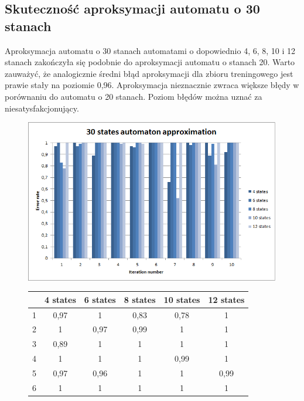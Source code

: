 \documentclass[runningheads,a4paper]{llncs}
\begin{document}
\FloatBarrier
\subsection{Skuteczność aproksymacji automatu o 30 stanach}

Aproksymacja automatu o 30 stanach automatami o dopowiednio 4, 6, 8, 10 i 12 stanach zakończyła się podobnie do aproksymacji automatu o stanach 20. Warto zauważyć, że analogicznie średni błąd aproksymacji dla zbioru treningowego jest prawie stały na poziomie 0,96. Aproksymacja nieznacznie zwraca większe błędy w porównaniu do automatu o 20 stanach. Poziom błędów można uznać za niesatysfakcjonujący.  \\

\begin{figure}[!htb]
\includegraphics[scale=0.92]{3.png}
\endminipage\hfill
\hspace{2.2cm}
\renewcommand{\arraystretch}{1.3}%
\begin{tabular}{@{}cccccc@{}}
\toprule
        & 4 states & 6 states & 8 states & 10 states & 12 states    \\ \midrule
1       & 0,97     & 1        & 0,83     & 0,78      & 1 \\
2       & 1        & 0,97     & 0,99     & 1         & 1 \\
3       & 0,89     & 1        & 1        & 1         & 1 \\
4       & 1        & 1        & 1        & 0,99      & 1   \\
5       & 0,97     & 0,96     & 1        & 1         & 0,99   \\
6       & 1        & 1        & 1        & 1         & 1    \\

\end{tabular}
\end{figure}
\end{document}
